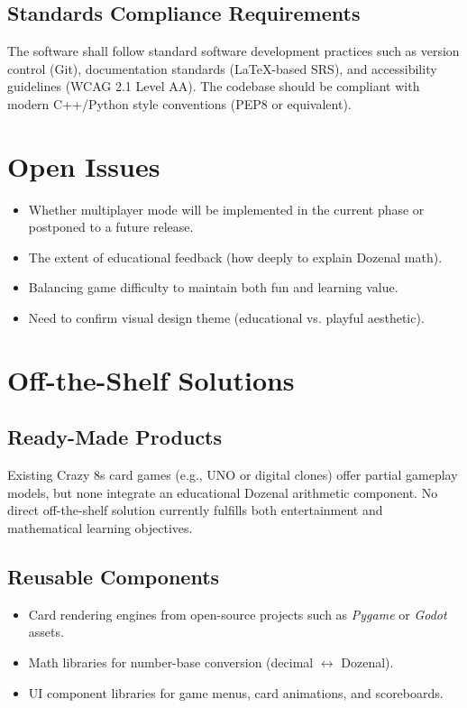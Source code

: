 \documentclass[12pt]{article}
\begin{document}
\subsection{Standards Compliance Requirements}
The software shall follow standard software development practices such as version control (Git), documentation standards (LaTeX-based SRS), and accessibility guidelines (WCAG 2.1 Level AA).
The codebase should be compliant with modern C++/Python style conventions (PEP8 or equivalent).

\section{Open Issues}
\begin{itemize}
    \item Whether multiplayer mode will be implemented in the current phase or postponed to a future release.
    \item The extent of educational feedback (how deeply to explain Dozenal math).
    \item Balancing game difficulty to maintain both fun and learning value.
    \item Need to confirm visual design theme (educational vs. playful aesthetic).
\end{itemize}

\section{Off-the-Shelf Solutions}

\subsection{Ready-Made Products}
Existing Crazy 8s card games (e.g., UNO or digital clones) offer partial gameplay models, but none integrate an educational Dozenal arithmetic component.
No direct off-the-shelf solution currently fulfills both entertainment and mathematical learning objectives.

\subsection{Reusable Components}
\begin{itemize}
    \item Card rendering engines from open-source projects such as \textit{Pygame} or \textit{Godot} assets.
    \item Math libraries for number-base conversion (decimal $\leftrightarrow$ Dozenal).
    \item UI component libraries for game menus, card animations, and scoreboards.
\end{itemize}
\end{document}
